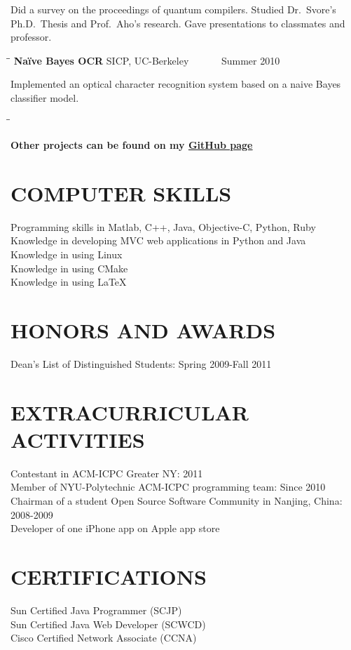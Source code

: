 \documentclass{res}
\begin{document}
\begin{resume}
    Did a survey on the proceedings of quantum compilers. Studied Dr.\ Svore's Ph.D.\ Thesis and Prof.\ Aho's research. Gave presentations to classmates and  professor.
      \begin{tabbing}%
   \hspace{2.3in}\= \hspace{2.6in}\= \kill %
   {\bf Na\"{i}ve Bayes OCR}  \>SICP, UC-Berkeley\> ~~~~~~Summer 2010\\
   \end{tabbing}\vspace{-20pt}
    Implemented an optical character recognition system based on a naive Bayes classifier model. 
    \begin{tabbing}
   \hspace{2.3in}\= \hspace{2.6in}\= \kill %
 
    {\bf Other projects can be found on my \href{https://github.com/tingleshao}{\underline{GitHub page}}} 
  \end{tabbing}
  
  

\section{COMPUTER SKILLS}          
    Programming skills in Matlab, C++, Java, Objective-C, Python, Ruby  \\
    Knowledge in developing MVC web applications in Python and Java\\
    Knowledge in using Linux \\ 
    Knowledge in using CMake \\
    Knowledge in using \LaTeX \\

  
 
\section{HONORS AND AWARDS}          
    Dean's List of Distinguished Students: Spring 2009-Fall 2011  \\       
     
\section{EXTRACURRICULAR ACTIVITIES}          
    Contestant in ACM-ICPC Greater NY: 2011\\
    Member of NYU-Polytechnic ACM-ICPC programming team: Since 2010\\         
    Chairman of a student Open Source Software Community in Nanjing, China: 2008-2009 \\        
    Developer of one iPhone app on Apple app store
    
 \section{CERTIFICATIONS}          
    Sun Certified Java Programmer (SCJP)\\
    Sun Certified Java Web Developer (SCWCD)\\         
    Cisco Certified Network Associate  (CCNA)\\     
  
\end{resume}
\end{document}
